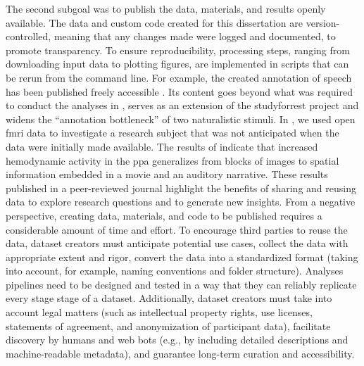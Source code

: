 

%

%
The second subgoal was to publish the data, materials, and results openly
available.
%
The data and custom code created for this dissertation are version-controlled,
meaning that any changes made were logged and documented, to promote
transparency.
%
To ensure reproducibility, processing steps, ranging from downloading input data
to plotting figures, are implemented in scripts that can be rerun from the
command line.
%
For example, the created annotation of speech has been published freely
accessible \citep{haeusler2021speechanno}.
%
Its content goes beyond what was required to conduct the analyses in
\citet{haeusler2022processing}, serves as an extension of the studyforrest
project and widens the ``annotation bottleneck'' \citep[][p.
16]{aliko2020naturalistic} of two naturalistic stimuli.
%
In \citet{haeusler2022processing}, we used open \ac{fmri} data to investigate a
research subject that was not anticipated when the data were initially made
available.
%
The results of \citet{haeusler2022processing} indicate that increased
hemodynamic activity in the \ac{ppa} generalizes from blocks of images to
spatial information embedded in a movie and an auditory narrative.
%
These results published in a peer-reviewed journal highlight the benefits of
sharing and reusing data to explore research questions and to generate new
insights.
From a negative perspective, creating data, materials, and code to be published
requires a considerable amount of time and effort.
%
To encourage third parties to reuse the data, dataset creators must anticipate
potential use cases, collect the data with appropriate extent and rigor, convert
the data into a standardized format (taking into account, for example, naming
conventions and folder structure).
Analyses pipelines need to be designed and tested in a way that they can
reliably replicate every stage stage of a dataset.
Additionally, dataset creators must take into account legal matters (such as
intellectual property rights, use licenses, statements of agreement, and
anonymization of participant data), facilitate discovery by humans and web bots
(e.g., by including detailed descriptions and machine-readable metadata), and
guarantee long-term curation and accessibility.

